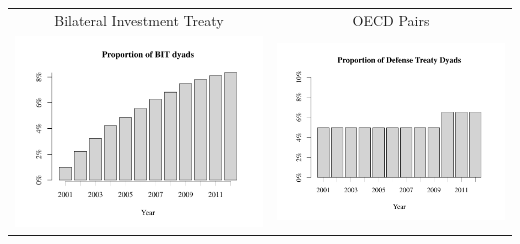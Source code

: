 \documentclass[reqno,onecolumn,letterpaper,12pt]{article}
\begin{document}
\begin{longtable}{c@{\hskip -.8cm}c}
Bilateral Investment Treaty& OECD Pairs \\
\includegraphics[height=.17\textheight, clip=true, trim=0cm 1cm 0cm 2cm]{SI_figures/descriptive_plots/BIT_barplot.pdf} &
 \includegraphics[height=.17\textheight, clip=true, trim=0cm 1cm 0cm 2cm]{SI_figures/descriptive_plots/OECDpair_barplot.pdf} \\


\end{longtable}
\end{document}
